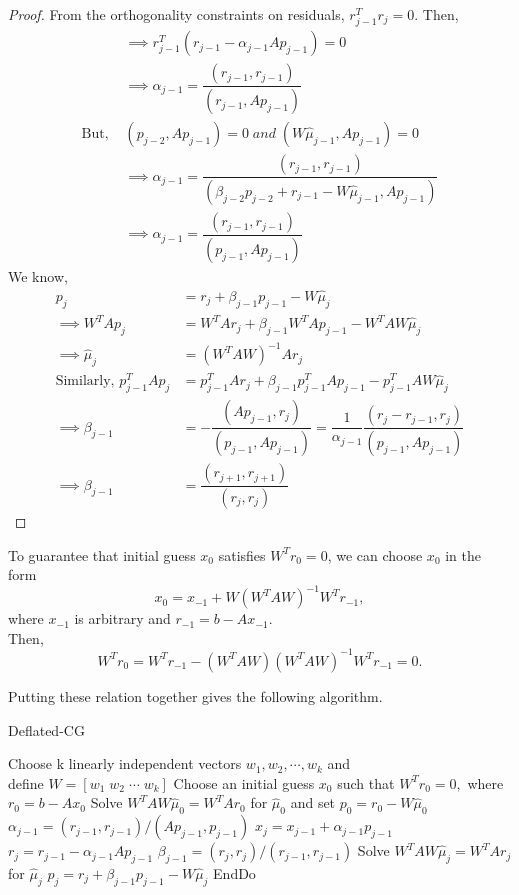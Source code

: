 \documentclass[10pt,a4paper]{article}
\begin{document}
\begin{proof}
From the orthogonality constraints on residuals, $r^T_{j-1}r_j=0.$ Then,
\begin{align*}
&\implies r^T_{j-1}(r_{j-1}-\alpha_{j-1}Ap_{j-1}) = 0 \\
&\implies \alpha_{j-1}=\dfrac{(r_{j-1},r_{j-1})}{(r_{j-1},Ap_{j-1})} \\
\text{But, }&(p_{j-2},Ap_{j-1})=0\;and\;(W\hat{\mu}_{j-1},Ap_{j-1})=0 \\
&\implies \alpha_{j-1}=\dfrac{(r_{j-1},r_{j-1})}{(\beta_{j-2}p_{j-2}+r_{j-1}-W\hat{\mu}_{j-1},Ap_{j-1})} \\
&\implies \alpha_{j-1}=\dfrac{(r_{j-1},r_{j-1})}{(p_{j-1},Ap_{j-1})}
\end{align*}
We know, 
\begin{align*}
p_j&=r_j+\beta_{j-1}p_{j-1}-W\hat{\mu}_j \\
\implies W^TAp_j&=W^TAr_j+\beta_{j-1}W^TAp_{j-1}-W^TAW\hat{\mu}_j \\
\implies \hat{\mu}_j&=(W^TAW)^{-1}Ar_j \\
\text{Similarly, }p^T_{j-1}Ap_j&=p^T_{j-1}Ar_j+\beta_{j-1}p^T_{j-1}Ap_{j-1}-p^T_{j-1}AW\hat{\mu}_j \\
\implies \beta_{j-1} &= -\dfrac{(Ap_{j-1},r_j)}{(p_{j-1},Ap_{j-1})}=\dfrac{1}{\alpha_{j-1}}\dfrac{(r_j-r_{j-1},r_j)}{(p_{j-1},Ap_{j-1})} \\
\implies \beta_{j-1} &= \dfrac{(r_{j+1},r_{j+1})}{(r_j,r_j)}
\end{align*}
\end{proof}

\begin{remark}
To guarantee that initial guess $x_0$ satisfies $W^Tr_0=0$, we can choose $x_0$ in the form 
$$x_0=x_{-1}+W(W^TAW)^{-1}W^Tr_{-1},$$
where $x_{-1}$ is arbitrary and $r_{-1}=b-Ax_{-1}$. \\
Then, $$W^Tr_0 = W^Tr_{-1}-(W^TAW)(W^TAW)^{-1}W^Tr_{-1}=0.$$
\end{remark}

Putting these relation together gives the following algorithm.

\newpage

\begin{algorithm}
\caption{Deflated-CG}
\begin{algorithmic}[1]
\State Choose k linearly independent vectors $w_1,w_2,\cdots,w_k$ and \\ \qquad define $W=[w_1\;w_2\;\cdots\;w_k]$
\State Choose an initial guess $x_0$ such that $W^Tr_0=0,$ where $r_0=b-Ax_0$
\State Solve $W^TAW\hat{\mu}_0=W^TAr_0$ for $\hat{\mu}_0$ and set $p_0=r_0-W\hat{\mu}_0$
	\State $\alpha_{j-1}=(r_{j-1},r_{j-1})/(Ap_{j-1},p_{j-1})$
	\State $x_{j}=x_{j-1}+\alpha_{j-1}p_{j-1}$
	\State $r_{j}=r_{j-1}-\alpha_{j-1}Ap_{j-1}$
	\State $\beta_{j-1}=(r_j,r_j)/(r_{j-1},r_{j-1})$
	\State Solve $W^TAW\hat{\mu}_j=W^TAr_j$ for $\hat{\mu}_j$
	\State $p_{j}=r_{j}+\beta_{j-1}p_{j-1}-W\hat{\mu}_j$
\EndFor
\State EndDo
\end{algorithmic}
\end{algorithm}
\end{document}
